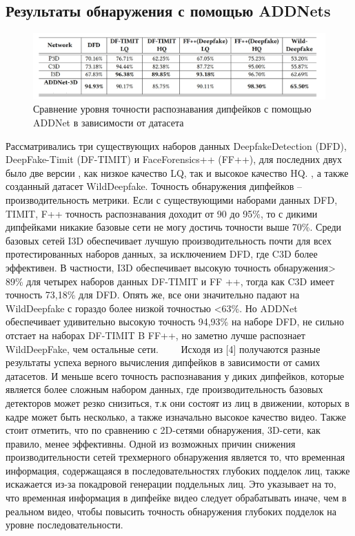 \documentclass[12pt]{article}
\begin{document}
    \subsection {Результаты обнаружения с помощью ADDNets}
        \begin{figure}[h!]
            \centering
            \includegraphics[width = 500 pt] {21.jpg}
            \caption{Сравнение уровня точности распознавания дипфейков с помощью ADDNet в зависимости от датасета}
        \end{figure}
        Рассматривались три существующих наборов данных DeepfakeDetection (DFD), DeepFake-Timit (DF-TIMIT) и FaceForensics++ (FF++), для последних двух было две версии , как низкое качество LQ, так и высокое качество HQ. , а также созданный датасет WildDeepfake. Точность обнаружения дипфейков – производительность метрики. Если с существующими наборами данных DFD, TIMIT, F++ точность распознавания доходит от 90 до 95\%, 
        то с дикими дипфейками никакие базовые сети не могу достичь точности выше 70\%.
        Среди базовых сетей I3D
обеспечивает лучшую производительность почти для всех протестированных
наборов данных, за исключением DFD, где C3D более эффективен. В частности,
I3D обеспечивает высокую точность обнаружения> 89\% для четырех наборов
данных DF-TIMIT и FF ++, тогда как C3D имеет точность 73,18\% для DFD. Опять же,
все они значительно падают на WildDeepfake с гораздо более низкой точностью
<63\%. Но ADDNet обеспечивает удивительно высокую точность 94,93\% на наборе DFD, не сильно отстает на наборах DF-TIMIT B FF++, но заметно лучше распознает WildDeepFake, чем остальные сети.\newline 
$\qquad$Исходя из [4] получаются разные результаты успеха верного вычисления дипфейков в зависимости от самих датасетов. И меньше всего точность распознавания у диких дипфейков, которые является более сложным набором данных, где производительность базовых детекторов может резко снизиться, т.к они состоят из лиц в движении, которых в кадре может быть несколько, а также изначально высокое качество видео.
        Также стоит отметить, что по сравнению с 2D-сетями обнаружения, 3D-сети, как правило, менее эффективны. Одной из возможных причин снижения производительности сетей трехмерного обнаружения является то, что временная информация, содержащаяся в последовательностях глубоких подделок лиц, также искажается из-за покадровой генерации поддельных лиц. Это указывает на то, что временная информация в дипфейке видео следует обрабатывать иначе, чем в реальном видео, чтобы повысить точность обнаружения глубоких подделок на уровне последовательности. 
    \newpage
\end{document}
